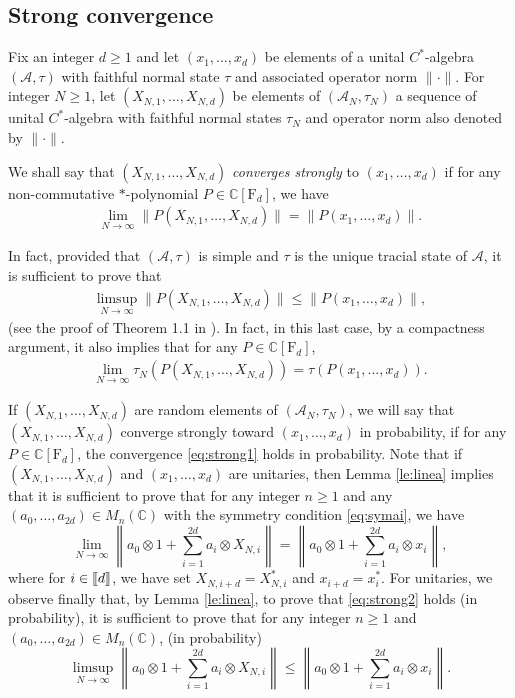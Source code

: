 \documentclass[11pt]{article}
\newcommand{\cA}{\mathcal{A}}
\newcommand{\dF}{\mathrm{F}}
\newcommand{\dC}{\mathbb {C}}
\newcommand{\NRM}[1]{{{\left\| #1\right\|}}} %
\newcommand{\1}{1\!\!{\sf I}}
\newcommand{\INT}[1]{{{\left[\hspace{-1.4pt}\left[#1\right]\hspace{-1.4pt}\right]}}}
\begin{document}
\subsection{Strong convergence}
\label{subsec:strong}


Fix an integer $d\geq 1$ and let $(x_1,\ldots,x_d)$ be elements of a unital $C^*$-algebra $(\cA,\tau)$ with faithful normal state $\tau$ and associated operator norm $\| \cdot \|$. For integer $N \geq 1$, let $(X_{N,1},\ldots,X_{N,d})$ be elements of $(\cA_N, \tau_N) $ a sequence of unital $C^*$-algebra with faithful normal states $\tau_N$ and operator norm also denoted by $\| \cdot \|$. 

We shall say that $(X_{N,1},\ldots,X_{N,d})$ {\em converges strongly} to $(x_1,\ldots,x_d)$ if for any non-commutative $*$-polynomial $P \in \dC[\dF_d]$,  we have
\begin{eqnarray}\label{eq:strong1}
\lim_{N \to \infty} \| P ( X_{N,1},\ldots, X_{N,d}) \| = \| P ( x_{1},\ldots, x_{d}) \|. 
\end{eqnarray}

In fact, provided that $(\cA,\tau)$ is simple and $\tau$ is the unique tracial state of $\cA$, it is sufficient to prove that 
\begin{eqnarray}\label{eq:strong2}
\limsup_{N \to \infty} \| P ( X_{N,1},\ldots, X_{N,d}) \| \leq \| P ( x_{1},\ldots, x_{d}) \|, 
\end{eqnarray}
(see the proof of Theorem 1.1 in \cite{louder2023strongly}). In fact, in this last case, 
by a compactness argument,
it also implies that for any $P \in \dC[\dF_d]$,
\begin{eqnarray*}
\lim_{N \to \infty} \tau_N (  P ( X_{N,1},\ldots, X_{N,d}) ) = \tau (  P ( x_{1},\ldots, x_{d})) .
\end{eqnarray*}

If $(X_{N,1},\ldots,X_{N,d})$ are random elements of $(\cA_N,\tau_N)$, we will say that $(X_{N,1},\ldots,X_{N,d})$ converge strongly toward $(x_1,\ldots,x_d)$ in probability, if for any $P \in \dC[\dF_d]$, the convergence \eqref{eq:strong1} holds in probability.
Note that if $(X_{N,1},\ldots,X_{N,d})$ and $(x_1,\ldots,x_d)$ are unitaries, then Lemma \ref{le:linea} implies that it is sufficient to prove that for any integer $n\geq 1$ and any $(a_0,\ldots,a_{2d}) \in M_n(\dC)$ with the symmetry condition \eqref{eq:symai}, we have 
$$
\lim_{N \to \infty} \NRM{ a_0 \otimes 1 + \sum_{i=1}^{2d} a_i \otimes X_{N,i} } = \NRM{ a_0 \otimes 1 + \sum_{i=1}^{2d} a_i \otimes x_{i} },
$$
where for $i \in \INT{d}$, we have set $X_{N,i+d} = X_{N,i}^*$ and $x_{i+d} = x_{i}^*$. 
For unitaries, we observe finally  that, by Lemma \ref{le:linea}, to prove that \eqref{eq:strong2} holds (in probability), it is sufficient to prove that for any integer $n \geq 1$ and $(a_0,\ldots,a_{2d}) \in M_n(\dC)$, (in probability) 
\begin{equation}\label{eq:strong2A}
\limsup_{N \to \infty} \NRM{ a_0 \otimes 1 + \sum_{i=1}^{2d} a_i \otimes X_{N,i} } \leq \NRM{ a_0 \otimes 1 + \sum_{i=1}^{2d} a_i \otimes x_{i} }.
\end{equation}
\end{document}
